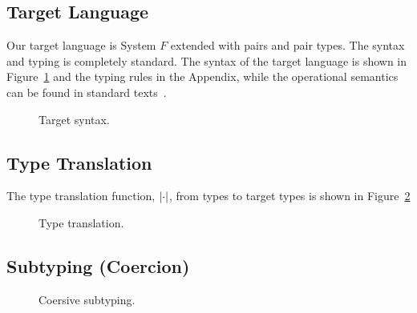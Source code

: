 
\subsection{Target Language}

Our target language is System $F$ extended with pairs and pair types. The syntax
and typing is completely standard. The syntax of the target language is shown in
Figure~\ref{fig:f-syntax} and the typing rules in the Appendix, while the
operational semantics can be found in standard texts~\cite{pierce2002types}.
\begin{figure}[h]
  
  \caption{Target syntax.}
  \label{fig:f-syntax}
\end{figure}



\subsection{Type Translation}

The type translation function, $\lvert \cdot \rvert$, from \name types to target types is
shown in Figure~\ref{fig:type-translation}

\begin{figure}[h]

\caption{Type translation.}
\label{fig:type-translation}
\end{figure}


\subsection{Subtyping (Coercion)}

\begin{figure*}

\caption{Coersive subtyping.}
\end{figure*}

